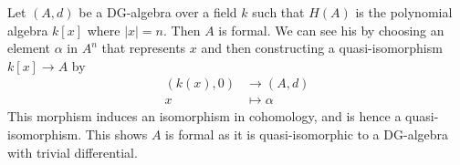 \begin{example}
Let $(A, d)$ be a DG-algebra over a field $k$ such that $H(A)$ is the polynomial algebra $k[x]$ where $|x|=n$. Then $A$ is formal. We can see his by choosing an element $\alpha$ in $A^n$ that represents $x$ and then constructing a quasi-isomorphism $k[x]\longrightarrow A$ by
\begin{align*}
    (k(x), 0)&\longrightarrow (A,d) \\
    x &\longmapsto \alpha
\end{align*} 
This morphism induces an isomorphism in cohomology, and is hence a quasi-isomorphism. This shows $A$ is formal as it is quasi-isomorphic to a DG-algebra with trivial differential. 
\end{example}














